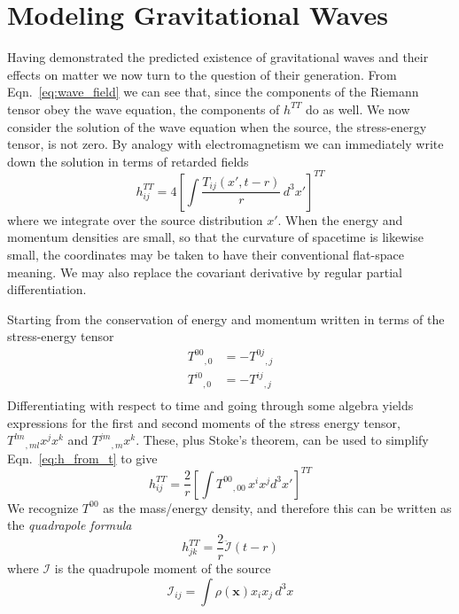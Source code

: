 \section{Modeling Gravitational Waves}

Having demonstrated the predicted existence of gravitational waves and
their effects on matter we now turn to the question of their
generation.  From Eqn.~\ref{eq:wave_field} we can see that, since
the components of the Riemann tensor obey the wave equation, the
components of $h^{TT}$ do as well.  We now consider the solution of
the wave equation when the source, the stress-energy tensor, is not
zero.  By analogy with electromagnetism we can immediately write down
the solution in terms of retarded fields
%
\begin{equation}
\label{eq:h_from_t}
h^{TT}_{ij} = 4 \left[ \int \frac{T_{ij}(x', t-r)}{r}\, d^3 x'
\right]^{TT}
\end{equation}
%
where we integrate over the source distribution $x'$.  When the energy
and momentum densities are small, so that the curvature of spacetime
is likewise small, the coordinates may be taken to have their
conventional flat-space meaning.  We may also replace the covariant
derivative by regular partial differentiation.

Starting from the conservation of energy and momentum written in terms
of the stress-energy tensor
%
\begin{align*}
{T^{00}}_{,0} &= - {T^{0j}}_{,j} \\
{T^{i0}}_{,0} &= - {T^{ij}}_{,j} \\
\end{align*}
%
Differentiating with respect to time and going through some algebra
yields expressions for the first and second moments of the stress
energy tensor, ${T^{lm}}_{,ml} x^j x^k$ and ${T^{jm}}_{,m} x^k$.  These,
plus Stoke's theorem, can be used to simplify
Eqn.~\ref{eq:h_from_t} to give
%
\begin{equation*}
h^{TT}_{ij} = \frac{2}{r} \left[
\int {T^{00}}_{,00}\, x^i x^j d^3 x' \right]^{TT}
\end{equation*}
%
We recognize $T^{00}$ as the mass/energy density, and therefore this
can be written as the \emph{quadrapole formula}
%
\begin{equation}
\label{eq:quadrupole_formula}
h^{TT}_{jk} = \frac{2}{r} \ddot{\mathcal{I}}(t-r)
\end{equation}
%
where $\mathcal{I}$ is the quadrupole moment of the source
%
\begin{equation*}
\mathcal{I}_{ij} = \int \rho(\mathbf{x})x_i x_j\,d^3 x
\end{equation*}

